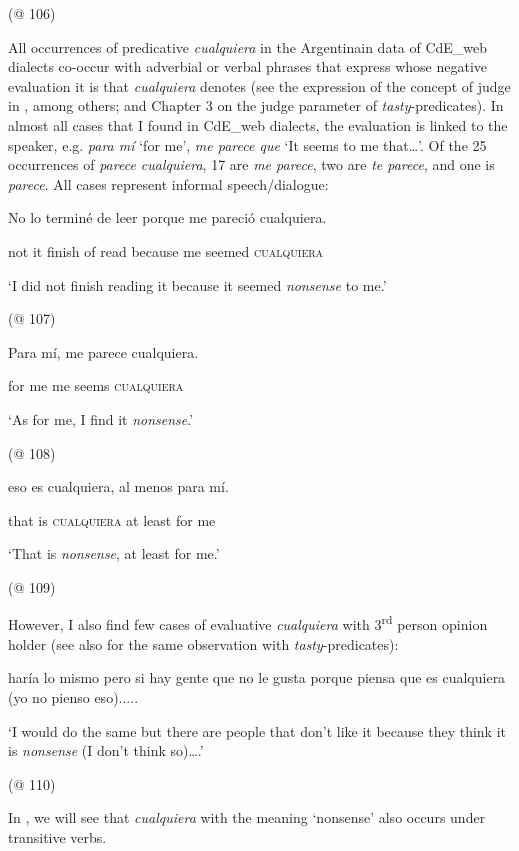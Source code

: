     (@ 106)

All occurrences of predicative \textit{cualquiera} in the Argentinain data of CdE\_web dialects co-occur with adverbial or verbal phrases that express whose negative evaluation it is that \textit{cualquiera} denotes (see the expression of the concept of judge in \citealt{Lasersohn2005}, among others; and Chapter 3 on the judge parameter of \textit{tasty}{}-predicates). In almost all cases that I found in CdE\_web dialects, the evaluation is linked to the speaker, e.g. \textit{para mí} ‘for me’, \textit{me parece que} ‘It seems to me that…’. Of the 25 occurrences of \textit{parece cualquiera}, 17 are \textit{me parece}, two are \textit{te parece}, and one is \textit{parece}. All cases represent informal speech/dialogue:

    No  lo  terminé  de  leer  porque  me  pareció  cualquiera.

    not  it  finish  of  read  because  me  seemed  \textsc{cualquiera}

    ‘I did not finish reading it because it seemed \textit{nonsense} to me.’

    (@ 107)

    Para  mí,  me  parece  cualquiera.

    for  me  me  seems  \textsc{cualquiera}

    ‘As for me, I find it \textit{nonsense}.’

    (@ 108)

    eso  es  cualquiera,  al  menos  para  mí.

    that  is  \textsc{cualquiera}  at  least  for  me

    ‘That is \textit{nonsense}, at least for me.’

    (@ 109)

However, I also find few cases of evaluative \textit{cualquiera} with 3\textsuperscript{rd} person opinion holder (see also \citealt{Lasersohn2005} for the same observation with \textit{tasty}{}-predicates):

    haría lo mismo pero si hay gente que no le gusta porque piensa que es cualquiera (yo no pienso eso).....

    ‘I would do the same but there are people that don’t like it because they think it is \textit{nonsense} (I don’t think so)….’

    (@ 110)

In , we will see that \textit{cualquiera} with the meaning ‘nonsense’ also occurs under transitive verbs.

